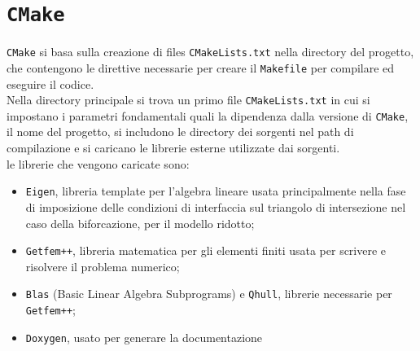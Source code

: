 \section{\texttt{CMake}}
\texttt{CMake} si basa sulla creazione di files \texttt{CMakeLists.txt} nella directory del progetto, che contengono le direttive necessarie per creare il \texttt{Makefile} per compilare ed eseguire il codice. \\
Nella directory principale si trova un primo file \texttt{CMakeLists.txt} in cui si impostano i parametri fondamentali quali la dipendenza dalla versione di \texttt{CMake}, il nome del progetto, si includono le directory dei sorgenti nel path di compilazione e si caricano le librerie esterne utilizzate dai sorgenti. \\
le librerie che vengono caricate sono:
\begin{itemize}
\item \texttt{Eigen}, libreria template per l'algebra lineare usata principalmente nella fase di imposizione delle condizioni di interfaccia sul triangolo di intersezione nel caso della biforcazione, per il modello ridotto;
\item \texttt{Getfem++}, libreria matematica per gli elementi finiti usata per scrivere e risolvere il problema numerico;
\item \texttt{Blas} (Basic Linear Algebra Subprograms) e \texttt{Qhull}, librerie necessarie per \texttt{Getfem++};
\item \texttt{Doxygen}, usato per generare la documentazione
\end{itemize}


